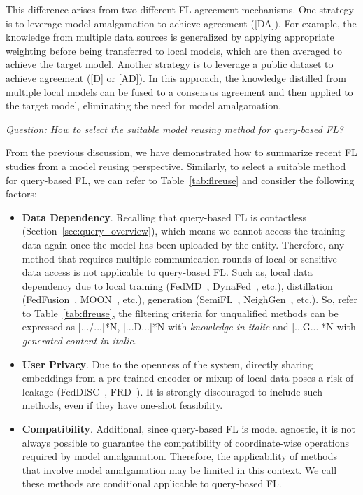 This difference arises from two different FL agreement mechanisms. 
One strategy is to leverage model amalgamation to achieve agreement ([DA]). 
For example, the knowledge from multiple data sources is generalized by applying appropriate weighting before being transferred to local models, which are then averaged to achieve the target model.
Another strategy is to leverage a public dataset to achieve agreement ([D] or [AD]). 
In this approach, the knowledge distilled from multiple local models can be fused to a consensus agreement and then applied to the target model, eliminating the need for model amalgamation.

\textit{Question: How to select the suitable model reusing method for query-based FL?}%

From the previous discussion, we have demonstrated how to summarize recent FL studies from a model reusing perspective.
Similarly, to select a suitable method for query-based FL, we can refer to Table~\ref{tab:flreuse} and consider the following factors:
\begin{itemize}
  \item \textbf{Data Dependency}. Recalling that query-based FL is contactless (Section~\ref{sec:query_overview}), which means we cannot access the training data again once the model has been uploaded by the entity.
  Therefore, any method that requires multiple communication rounds of local or sensitive data access is not applicable to query-based FL.
  Such as, local data dependency due to local training (FedMD~\cite{li2019fedmd}, DynaFed~\cite{pi2022dynafed}, etc.), distillation (FedFusion~\cite{yao2019towards}, MOON~\cite{li2021model}, etc.), generation (SemiFL~\cite{diao2022semifl}, NeighGen~\cite{zhang2021subgraph}, etc.).
  So, refer to Table~\ref{tab:flreuse}, the filtering criteria for unqualified methods can be expressed as [.../...]*N, [...D...]*N with \textit{knowledge in italic} and [...G...]*N with \textit{generated content in italic}.
  \item \textbf{User Privacy}. Due to the openness of the system, directly sharing embeddings from a pre-trained encoder or mixup of local data poses a risk of leakage (FedDISC~\cite{yang2023exploring}, FRD~\cite{cha2019federated}). It is strongly discouraged to include such methods, even if they have one-shot feasibility.
  \item \textbf{Compatibility}. Additional, since query-based FL is model agnostic, it is not always possible to guarantee the compatibility of coordinate-wise operations required by model amalgamation. Therefore, the applicability of methods that involve model amalgamation may be limited in this context. We call these methods are conditional applicable to query-based FL.
\end{itemize}


